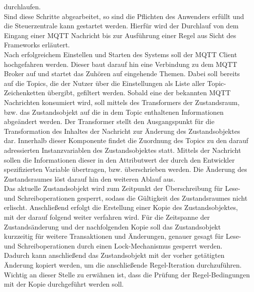         durchlaufen.  
        \\
        \linebreak
        Sind diese Schritte abgearbeitet, so sind die Pflichten des Anwenders erfüllt und die Steuerzentrale kann gestartet werden. 
        Hierfür wird der Durchlauf von dem Eingang einer \acs{MQTT} Nachricht bis zur Ausführung einer Regel aus Sicht des Frameworks 
        erläutert.
        \\
        \linebreak
        Nach erfolgreichem Einstellen und Starten des Systems soll der \acs{MQTT} Client hochgefahren werden. Dieser baut darauf hin eine 
        Verbindung zu dem \acs{MQTT} Broker auf und startet das Zuhören auf eingehende Themen. Dabei soll bereits auf die Topics,  
        die der Nutzer über die Einstellungen als Liste aller Topic-Zeichenketten übergibt, gefiltert werden. Sobald eine der bekannten 
        \acs{MQTT} Nachrichten konsumiert wird, soll mittels des Transformers der Zustandsraum, bzw. das Zustandsobjekt 
        auf die in dem Topic enthaltenen Informationen abgeändert werden. Der Transformer stellt den Ausgangspunkt für die Transformation 
        des Inhaltes der Nachricht zur Änderung des Zustandsobjektes dar. Innerhalb dieser Komponente findet die Zuordnung 
        des Topics zu den darauf adressierten Instanzvariablen des Zustandsobjektes statt. Mittels der Nachricht sollen die Informationen dieser 
        in den Attributwert der durch den Entwickler spezifizierten Variable übertragen, bzw. überschrieben werden. Die Änderung des 
        Zustandsraumes löst darauf hin den weiteren Ablauf aus. 
        \\
        Das aktuelle Zustandsobjekt wird zum Zeitpunkt der Überschreibung für Lese- und Schreiboperationen gesperrt, sodass 
        die Gültigkeit des Zustandsraumes nicht erlischt. Anschließend erfolgt die Erstellung einer Kopie des Zustandsobjektes, mit der 
        darauf folgend weiter verfahren wird. Für die Zeitspanne der Zustandsänderung und der 
        nachfolgenden Kopie soll das Zustandsobjekt kurzzeitig für weitere Transaktionen und Änderungen, genauer gesagt für Lese- und 
        Schreiboperationen durch einen Lock-Mechanismus gesperrt werden. Dadurch kann anschließend das Zustandsobjekt mit der vorher 
        getätigten Änderung kopiert werden, um die anschließende Regel-Iteration durchzuführen. Wichtig an dieser Stelle zu 
        erwähnen ist, dass die Prüfung der Regel-Bedingungen mit der Kopie durchgeführt werden soll.
